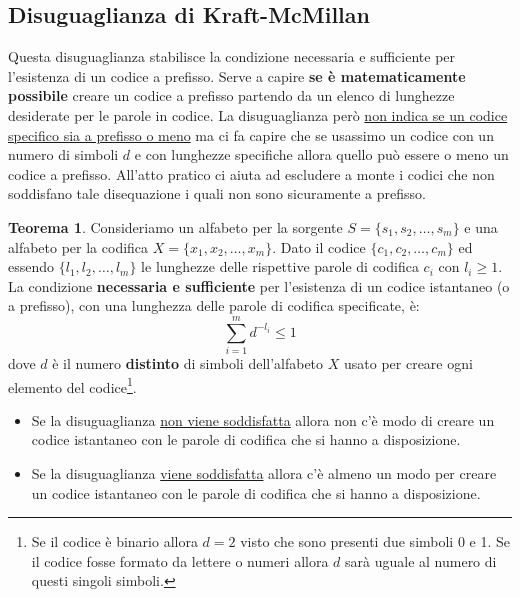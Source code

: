 \documentclass{article}
\theoremstyle{definition}
\newtheorem{theorem}{Teorema}[section] %
\numberwithin{equation}{section}
\begin{document}
\subsection{Disuguaglianza di Kraft-McMillan}
Questa disuguaglianza stabilisce la condizione necessaria e sufficiente per l'esistenza di un codice a prefisso. Serve a capire \textbf{se è matematicamente possibile} creare un codice a prefisso partendo da un elenco di lunghezze desiderate per le parole in codice. La disuguaglianza però \uline{non indica se un codice specifico sia a prefisso o meno} ma ci fa capire che se usassimo un codice con un numero di simboli $d$ e con lunghezze specifiche allora quello può essere o meno un codice a prefisso. All'atto pratico ci aiuta ad escludere a monte i codici che non soddisfano tale disequazione i quali non sono sicuramente a prefisso.
\begin{theorem}
    Consideriamo un alfabeto per la sorgente $S=\{s_1,s_2,\ldots,s_m\}$ e una alfabeto per la codifica $X=\{x_1,x_2,\ldots,x_m\}$. Dato il codice $\{c_1,c_2,\ldots,c_m\}$ ed essendo $\{l_1,l_2,\ldots,l_m\}$ le lunghezze delle rispettive parole di codifica $c_i$ con $l_i\geq 1$. La condizione \textbf{necessaria e sufficiente} per l'esistenza di un codice istantaneo (o a prefisso), con una lunghezza delle parole di codifica specificate, è:
    \begin{equation}\label{eq:disequality_kraft_mcmillan}
        \sum_{i=1}^m d^{-l_i}\leq 1
    \end{equation}
    dove $d$ è il numero \textbf{distinto} di simboli dell'alfabeto $X$ usato per creare ogni elemento del codice\footnote{Se il codice è binario allora $d=2$ visto che sono presenti due simboli 0 e 1. Se il codice fosse formato da lettere o numeri allora $d$ sarà uguale al numero di questi singoli simboli.}.
    \begin{itemize}
        \item Se la disuguaglianza \uline{non viene soddisfatta} allora non c'è modo di creare un codice istantaneo con le parole di codifica che si hanno a disposizione.
        \item Se la disuguaglianza \uline{viene soddisfatta} allora c'è almeno un modo per creare un codice istantaneo con le parole di codifica che si hanno a disposizione.
    \end{itemize}
\end{theorem}
\end{document}
